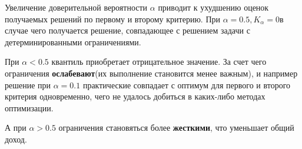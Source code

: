 Увеличение доверительной вероятности $\alpha$ приводит к ухудшению оценок получаемых решений по первому и второму критерию. При $\alpha = 0.5, K_{\alpha} = 0$в случае чего получается решение, совпадающее с решением задачи с детерминированными ограничениями. 

При $\alpha < 0.5$ квантиль приобретает отрицательное значение. За счет чего ограничения \textbf{ослабевают}(их выполнение становится менее важным), и например решение при $\alpha = 0.1$ практические совпадает с оптимум для первого и второго критерия одновременно, чего не удалось добиться в каких-либо методах оптимизации.

А при $\alpha > 0.5$ ограничения становяться более \textbf{жесткими}, что уменьшает общий доход.




%
%

